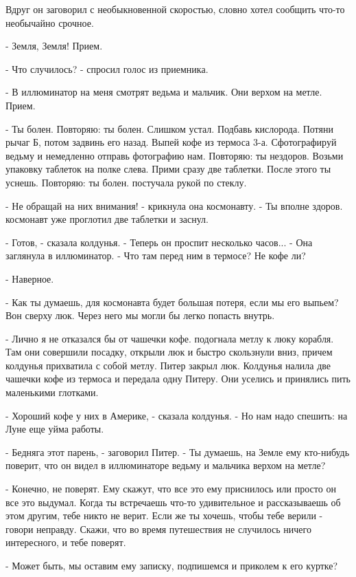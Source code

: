 Вдруг он заговорил с необыкновенной скоростью, словно хотел сообщить 
что-то необычайно срочное.
\par- Земля, Земля! Прием.
\par- Что случилось? - спросил голос из приемника.
\par- В иллюминатор на меня смотрят ведьма и мальчик. Они верхом на 
метле. Прием.
\par- Ты болен. Повторяю: ты болен. Слишком устал. Подбавь кислорода. 
Потяни рычаг Б, потом задвинь его назад. Выпей кофе из термоса 3-а. 
Сфотографируй ведьму и немедленно отправь фотографию нам. Повторяю: ты 
нездоров. Возьми упаковку таблеток на полке слева. Прими сразу две 
таблетки. После этого ты уснешь. Повторяю: ты болен.
 постучала рукой по стеклу.
\par- Не обращай на них внимания! - крикнула она космонавту. - Ты 
вполне здоров.
 космонавт уже проглотил две таблетки и заснул.
\par- Готов, - сказала колдунья. - Теперь он проспит несколько 
часов... - Она заглянула в иллюминатор. - Что там перед ним в термосе? 
Не кофе ли?
\par- Наверное.
\par- Как ты думаешь, для космонавта будет большая потеря, если мы его 
выпьем? Вон сверху люк. Через него мы могли бы легко попасть внутрь.
\par- Лично я не отказался бы от чашечки кофе.
 подогнала метлу к люку корабля. Там они совершили 
посадку, открыли люк и быстро скользнули вниз, причем колдунья 
прихватила с собой метлу. Питер закрыл люк. Колдунья налила две 
чашечки кофе из термоса и передала одну Питеру. Они уселись и 
принялись пить маленькими глотками.
\par- Хороший кофе у них в Америке, - сказала колдунья. - Но нам надо 
спешить: на Луне еще уйма работы.
\par- Бедняга этот парень, - заговорил Питер. - Ты думаешь, на Земле 
ему кто-нибудь поверит, что он видел в иллюминаторе ведьму и мальчика 
верхом на метле?
\par- Конечно, не поверят. Ему скажут, что все это ему приснилось или 
просто он все это выдумал. Когда ты встречаешь что-то удивительное и 
рассказываешь об этом другим, тебе никто не верит. Если же ты хочешь, 
чтобы тебе верили - говори неправду. Скажи, что во время путешествия 
не случилось ничего интересного, и тебе поверят.
\par- Может быть, мы оставим ему записку, подпишемся и приколем к его 
куртке?
